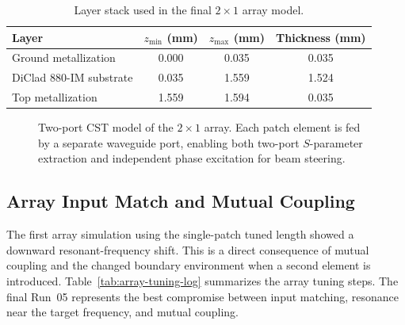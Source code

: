 \begin{table}[H]
\centering
\caption{Layer stack used in the final $2\times1$ array model.}
\label{tab:array-layer-stack}
\small
\renewcommand{\arraystretch}{1.16}
\begin{tabular}{@{}lccc@{}}
\toprule
\textbf{Layer} & \textbf{$z_{\min}$ (mm)} & \textbf{$z_{\max}$ (mm)} & \textbf{Thickness (mm)} \\
\midrule
Ground metallization & 0.000 & 0.035 & 0.035 \\
DiClad 880-IM substrate & 0.035 & 1.559 & 1.524 \\
Top metallization & 1.559 & 1.594 & 0.035 \\
\bottomrule
\end{tabular}
\end{table}

\begin{figure}[H]
    \centering
    \caption{Two-port CST model of the $2\times1$ array. Each patch element is fed by a separate waveguide port, enabling both two-port $S$-parameter extraction and independent phase excitation for beam steering.}
    \label{fig:array-port-view}
\end{figure}

\subsection{Array Input Match and Mutual Coupling}

The first array simulation using the single-patch tuned length showed a downward resonant-frequency
shift.  This is a direct consequence of mutual coupling and the changed boundary environment when a
second element is introduced.  Table~\ref{tab:array-tuning-log} summarizes the array tuning steps.  The
final Run~05 represents the best compromise between input matching, resonance near the target
frequency, and mutual coupling.

